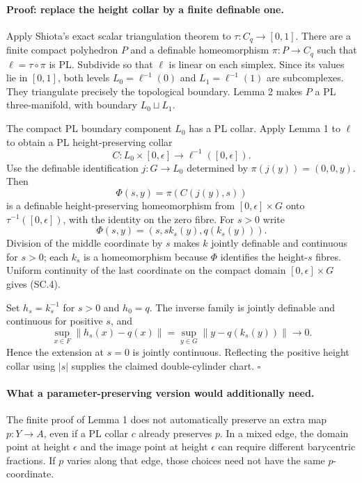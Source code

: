 \paragraph{Proof: replace the height collar by a finite definable one.}
Apply Shiota's exact scalar triangulation theorem to
$\tau:C_q\to[0,1]$. There are a finite compact polyhedron $P$ and a
definable homeomorphism $\pi:P\to C_q$ such that $\ell=\tau\circ\pi$ is
PL. Subdivide so that $\ell$ is linear on each simplex. Since its values
lie in $[0,1]$, both levels $L_0=\ell^{-1}(0)$ and $L_1=\ell^{-1}(1)$
are subcomplexes. They triangulate precisely the topological boundary.
Lemma 2 makes $P$ a PL three-manifold, with boundary $L_0\sqcup L_1$.

The compact PL boundary component $L_0$ has a PL collar. Apply Lemma 1 to
$\ell$ to obtain a PL height-preserving collar
\[
 C:L_0\times[0,\epsilon]\longrightarrow\ell^{-1}([0,\epsilon]).
\]
Use the definable identification $j:G\to L_0$ determined by
$\pi(j(y))=(0,0,y)$. Then
\[
 \Phi(s,y)=\pi(C(j(y),s))
\]
is a definable height-preserving homeomorphism from $[0,\epsilon]\times G$
onto $\tau^{-1}([0,\epsilon])$, with the identity on the zero fibre.
For $s>0$ write
\[
 \Phi(s,y)=(s,s k_s(y),q(k_s(y))).
 \tag{SC.7}
\]
Division of the middle coordinate by $s$ makes $k$ jointly definable and
continuous for $s>0$; each $k_s$ is a homeomorphism because $\Phi$ identifies
the height-$s$ fibres. Uniform continuity of the last coordinate on the
compact domain $[0,\epsilon]\times G$ gives (SC.4).

Set $h_s=k_s^{-1}$ for $s>0$ and $h_0=q$. The inverse family is jointly
definable and continuous for positive $s$, and
\[
 \sup_{x\in F}\|h_s(x)-q(x)\|
 =\sup_{y\in G}\|y-q(k_s(y))\|\longrightarrow0.
\]
Hence the extension at $s=0$ is jointly continuous. Reflecting the positive
height collar using $|s|$ supplies the claimed double-cylinder chart.
\hfill$\square$

\paragraph{What a parameter-preserving version would additionally need.}
The finite proof of Lemma 1 does not automatically preserve an extra map
$p:Y\to A$, even if a PL collar $c$ already preserves $p$. In a mixed edge,
the domain point at height $\epsilon$ and the image point at height
$\epsilon$ can require different barycentric fractions. If $p$ varies
along that edge, those choices need not have the same $p$-coordinate.

